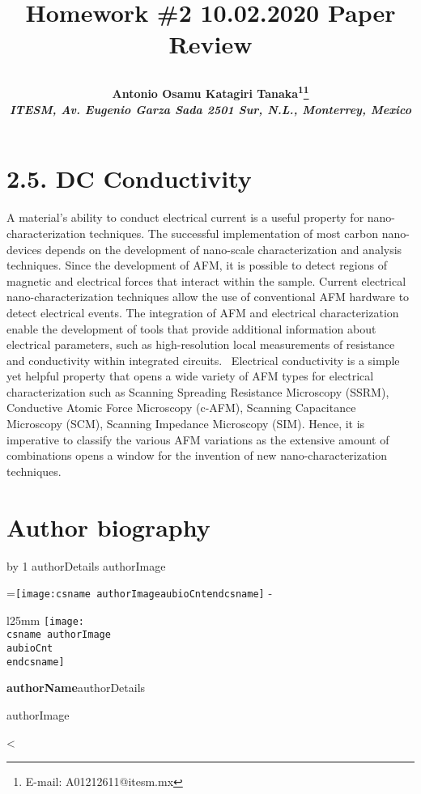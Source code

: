 \documentclass[11pt]{article}
\makeatletter
\newcounter{aubio}
\newcommand{\checkheight}[1]{%
  \par \penalty-100\begingroup%
  \setbox8=\hbox{#1}%
  \setlength{\dimen@}{\ht8}%
  \dimen@ii\pagegoal \advance\dimen@ii-\pagetotal
  \ifdim \dimen@>\dimen@ii
    \break
  \fi\endgroup}
\def\printBio{%
  \@tempcnta=0
   \loop
     \advance \@tempcnta by 1
     \def\aubioCnt{\the\@tempcnta}
     \setlength{\intextsep}{0pt}%
     \setlength{\columnsep}{10pt}%
     \newbox\boxa%
     \setbox\boxa\vbox{\csname authorDetails\aubioCnt\endcsname}
     \expandafter\ifx\csname authorImage\aubioCnt\endcsname\relax%
      \else%
       \checkheight{\texttt{[image: \\csname authorImage\\aubioCnt\\endcsname]}}
        \begin{wrapfigure}{l}{25mm}
         \texttt{[image: \\csname authorImage\\aubioCnt\\endcsname]}%
        \end{wrapfigure}\par
      \fi
     {\parindent0pt\textbf{\csname authorName\aubioCnt\endcsname}\csname authorDetails\aubioCnt\endcsname \par\bigskip%
     \expandafter\ifx\csname authorImage\aubioCnt\endcsname\relax\else%
      \ifdim\the\ht\boxa < 90pt\vskip\dimexpr(90pt -\the\ht\boxa-1pc)\fi%
     \fi}%
      \ifnum\@tempcnta < \theaubio
   \repeat
   }
\def\NormalBaseline{\def\baselinestretch{1.1}}
\def\@shorttitle{\@empty}
\def\shorttitle#1{\gdef\@shorttitle{#1}}
\makeatother
\begin{document}
\renewcommand*\rmdefault{bch}\normalfont\upshape

\shorttitle{Class Assignment - Class 0 }

\date{}  

  
\title{\NormalBaseline\raggedright\bfseries Homework \#2 10.02.2020 {\textemdash} Paper Review}
  \let\origthanks\thanks
\renewcommand\thanks[1]{\begingroup\let\rlap\relax\origthanks{#1}\endgroup}
\author{\hskip2pc\parbox{.95\textwidth}{\bfseries\large Antonio Osamu Katagiri Tanaka\textsuperscript{1}\thanks{E-mail: A01212611@itesm.mx}
      \\[3pt] 
    \normalfont\itshape\NormalBaseline \textsuperscript{} 
    ITESM\unskip, \normalfont\itshape\NormalBaseline Av. Eugenio Garza Sada 2501 Sur\unskip, N.L.\unskip, Monterrey\unskip, Mexico}}
    
    
\maketitle 
\pagestyle{custom}

    
\section{2.5. DC Conductivity\unskip~\protect\cite{691550:16367001}}
A material's ability to conduct electrical current is a useful property for nano-characterization techniques. The successful implementation of most carbon nano-devices depends on the development of nano-scale characterization and analysis techniques. Since the development of AFM, it is possible to detect regions of magnetic and electrical forces that interact within the sample. Current electrical nano-characterization techniques allow the use of conventional AFM hardware to detect electrical events. The integration of AFM and electrical characterization enable the development of tools that provide additional information about electrical parameters, such as high-resolution local measurements of resistance and conductivity within integrated circuits.\unskip~\cite{691550:16367043} Electrical conductivity is a simple yet helpful property that opens a wide variety of AFM types for electrical characterization such as Scanning Spreading Resistance Microscopy (SSRM), Conductive Atomic Force Microscopy (c-AFM), Scanning Capacitance Microscopy (SCM), Scanning Impedance Microscopy (SIM). Hence, it is imperative to classify the various AFM variations as the extensive amount of combinations opens a window for the invention of new nano-characterization techniques. \unskip~\cite{691550:16367043}

\clearpage 
    





\section*{Author biography}

\printBio 
\end{document}
